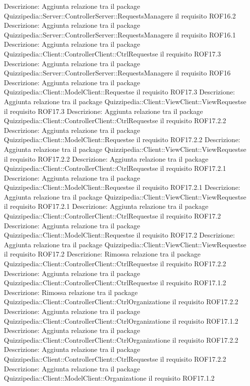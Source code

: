 Descrizione: Aggiunta relazione tra il package Quizzipedia::Server::ControllerServer::RequestsManagere il requisito ROF16.2 
Descrizione: Aggiunta relazione tra il package Quizzipedia::Server::ControllerServer::RequestsManagere il requisito ROF16.1 
Descrizione: Aggiunta relazione tra il package Quizzipedia::Client::ControllerClient::CtrlRequestse il requisito ROF17.3 
Descrizione: Aggiunta relazione tra il package Quizzipedia::Server::ControllerServer::RequestsManagere il requisito ROF16 
Descrizione: Aggiunta relazione tra il package Quizzipedia::Client::ModelClient::Requestse il requisito ROF17.3 
Descrizione: Aggiunta relazione tra il package Quizzipedia::Client::ViewClient::ViewRequestse il requisito ROF17.3 
Descrizione: Aggiunta relazione tra il package Quizzipedia::Client::ControllerClient::CtrlRequestse il requisito ROF17.2.2 
Descrizione: Aggiunta relazione tra il package Quizzipedia::Client::ModelClient::Requestse il requisito ROF17.2.2 
Descrizione: Aggiunta relazione tra il package Quizzipedia::Client::ViewClient::ViewRequestse il requisito ROF17.2.2 
Descrizione: Aggiunta relazione tra il package Quizzipedia::Client::ControllerClient::CtrlRequestse il requisito ROF17.2.1 
Descrizione: Aggiunta relazione tra il package Quizzipedia::Client::ModelClient::Requestse il requisito ROF17.2.1 
Descrizione: Aggiunta relazione tra il package Quizzipedia::Client::ViewClient::ViewRequestse il requisito ROF17.2.1 
Descrizione: Aggiunta relazione tra il package Quizzipedia::Client::ControllerClient::CtrlRequestse il requisito ROF17.2 
Descrizione: Aggiunta relazione tra il package Quizzipedia::Client::ModelClient::Requestse il requisito ROF17.2 
Descrizione: Aggiunta relazione tra il package Quizzipedia::Client::ViewClient::ViewRequestse il requisito ROF17.2 
Descrizione: Rimossa relazione tra il package Quizzipedia::Client::ControllerClient::CtrlRequestse il requisito ROF17.2.2 
Descrizione: Aggiunta relazione tra il package Quizzipedia::Client::ControllerClient::CtrlRequestse il requisito ROF17.1.2 
Descrizione: Rimossa relazione tra il package Quizzipedia::Client::ControllerClient::CtrlOrganizatione il requisito ROF17.2.2 
Descrizione: Aggiunta relazione tra il package Quizzipedia::Client::ControllerClient::CtrlOrganizatione il requisito ROF17.1.2 
Descrizione: Aggiunta relazione tra il package Quizzipedia::Client::ControllerClient::CtrlOrganizatione il requisito ROF17.2.2 
Descrizione: Aggiunta relazione tra il package Quizzipedia::Client::ControllerClient::CtrlRequestse il requisito ROF17.2.2 
Descrizione: Aggiunta relazione tra il package Quizzipedia::Client::ModelClient::Organizatione il requisito ROF17.1.2 
